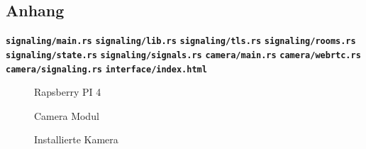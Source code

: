 \documentclass{article}
\begin{document}
\begin{onecolumn}
\begin{appendix}

\section*{Anhang}

\begin{scriptsize}
	\begin{flushleft}
		\texttt{\textbf{signaling/main.rs}}
		\texttt{\textbf{signaling/lib.rs}}
		\texttt{\textbf{signaling/tls.rs}}
		\texttt{\textbf{signaling/rooms.rs}}
		\texttt{\textbf{signaling/state.rs}}
		\texttt{\textbf{signaling/signals.rs}}
		\texttt{\textbf{camera/main.rs}}
		\texttt{\textbf{camera/webrtc.rs}}
		\texttt{\textbf{camera/signaling.rs}}
		\texttt{\textbf{interface/index.html}}
	\end{flushleft}
\end{scriptsize}

\begin{figure}[p]
	\centering
	\caption{Rapsberry PI 4}
\end{figure}

\begin{figure}[p]
	\centering
	\caption{Camera Modul}
\end{figure}

\begin{figure}[p]
	\centering
	\caption{Installierte Kamera}
\end{figure}

\end{appendix}
\end{onecolumn}

\end{document}
